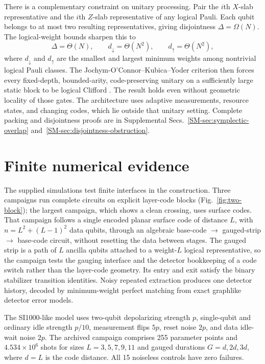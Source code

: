 There is a complementary constraint on unitary processing. Pair the $i$th
$X$-slab representative and the $i$th $Z$-slab representative of any logical
Pauli. Each qubit belongs to at most two resulting representatives, giving
disjointness $\Delta=\Omega(N)$. The logical-weight bounds sharpen this to
\begin{equation}
 \Delta=\Theta(N),\qquad
 d_\downarrow=\Theta(N^2),\qquad d_\uparrow=\Theta(N^2),
 \label{eq:disjoint}
\end{equation}
where $d_\downarrow$ and $d_\uparrow$ are the smallest and largest minimum
weights among nontrivial logical Pauli classes. The
Jochym-O'Connor--Kubica--Yoder criterion then forces every fixed-depth,
bounded-arity, code-preserving unitary on a sufficiently large static block
to be logical Clifford \cite{JochymDisjointness}. The result holds even
without geometric locality of those gates. The architecture uses adaptive
measurements, resource states, and changing codes, which lie outside that
unitary setting. Complete packing and disjointness proofs are in Supplemental
Secs.~\ref{SM-sec:symplectic-overlap} and~\ref{SM-sec:disjointness-obstruction}.

\section{Finite numerical evidence}
\label{sec:numerics-main}
The supplied simulations test finite interfaces in the construction.  Three
campaigns run complete circuits on explicit layer-code blocks
(Fig.~\ref{fig:two-block}); the largest campaign, which shows a clean
crossing, uses surface codes.
That campaign follows a single encoded planar surface code of distance
$L$, with $n=L^2+(L-1)^2$ data qubits, through an algebraic base-code
$\rightarrow$ gauged-strip $\rightarrow$ base-code circuit, without
resetting the data between stages. The gauged strip is a path of $L$
ancilla qubits attached to a weight-$L$ logical representative, so the
campaign tests the gauging interface and the detector bookkeeping of a code
switch rather than the layer-code geometry. Its entry and exit satisfy the binary
stabilizer transition identities. Noisy repeated extraction produces one
detector history, decoded by minimum-weight perfect matching from exact
graphlike detector error models.

The SI1000-like model uses two-qubit depolarizing strength $p$, single-qubit
and ordinary idle strength $p/10$, measurement flips $5p$, reset noise $2p$,
and data idle-wait noise $2p$. The archived campaign comprises 255 parameter
points and $4.534\times10^6$ shots for sizes $L=3,5,7,9,11$ and gauged
durations $G=d,2d,3d$, where $d=L$ is the code distance. All 15 noiseless controls have zero failures.

